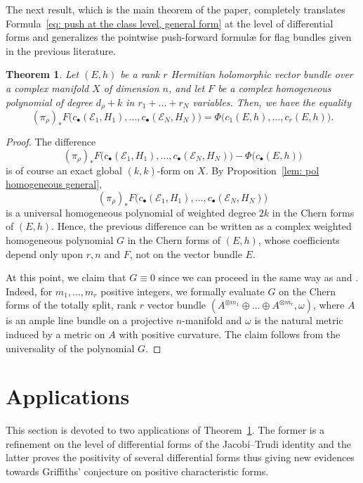 \documentclass[a4paper]{amsart}
\theoremstyle{plain}%
\newtheorem{theorem}{Theorem}[section]
\theoremstyle{definition}
\theoremstyle{remark}
\begin{document}
The next result, which is the main theorem of the paper, completely translates Formula~\eqref{eq: push at the class level, general form} at the level of differential forms and generalizes the pointwise push-forward formul{\ae} for flag bundles given in the previous literature.

\begin{theorem}\label{thm: darondeau-pragacz general for differential forms}
	Let $ (E,h) $ be a rank $ r $ Hermitian holomorphic vector bundle over a complex manifold $ X $ of dimension $ n $, and let $ F $ be a complex homogeneous polynomial of degree $ d_{\rho}+k $ in $ r_1 + \dots + r_N $ variables.
	Then, we have the equality
	\begin{equation}\label{eq: Gysin formula universal vector bundles}
		(\pi_{\rho})_{*} F\bigl(c_{\bullet}(\mathcal{E}_1,H_1),\dots,c_{\bullet}(\mathcal{E}_N,H_N)\bigr) = \Phi\big(c_1(E,h),\dots,c_r(E,h)\big) .
	\end{equation}
\end{theorem}
\begin{proof}
	The difference
	\[
	(\pi_{\rho})_{*} F\bigl(c_{\bullet}(\mathcal{E}_1,H_1),\dots,c_{\bullet}(\mathcal{E}_N,H_N)\bigr) - \Phi\big(c_{\bullet}(E,h)\big)
	\]
	is of course an exact global $ (k,k) $-form on $ X $.
	By Proposition~\ref{lem: pol homogeneous general},
	$$ (\pi_{\rho})_{*} F\bigl(c_{\bullet}(\mathcal{E}_1,H_1),\dots,c_{\bullet}(\mathcal{E}_N,H_N)\bigr) $$
	is a universal homogeneous polynomial of weighted degree $ 2k $ in the Chern forms of $ (E,h) $.
	Hence, the previous difference can be written as a complex weighted homogeneous polynomial $ G $ in the Chern forms of $ (E,h) $, whose coefficients depend only upon $ r,n $ and $ F $, not on the vector bundle $ E $.
	
	At this point, we claim that $ G \equiv 0 $ since we can proceed in the same way as \cite[Proposition 3.1]{Gul12} and \cite[Theorem 3.5]{DF20}.
	Indeed, for $ m_1,\dots,m_r $ positive integers, we formally evaluate $ G $ on the Chern forms of the totally split, rank $ r $ vector bundle $ ({A}^{\otimes m_1} \oplus \dots \oplus {A}^{\otimes m_r}, \omega) $, where $ A $ is an ample line bundle on a projective $ n $-manifold and $ \omega $ is the natural metric induced by a metric on $ A $ with positive curvature.
	The claim follows from the universality of the polynomial $ G $. 
\end{proof}


\section{Applications}
This section is devoted to two applications of Theorem~\ref{thm: darondeau-pragacz general for differential forms}.
The former is a refinement on the level of differential forms of the Jacobi--Trudi identity and the latter proves the positivity of several differential forms thus giving new evidences towards Griffiths' conjecture on positive characteristic forms.
\end{document}
